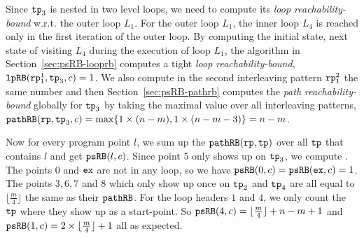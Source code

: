 Since $\mathtt{tp}_3$ is nested in two level loops, we need to compute its \emph{loop reachability-bound}
w.r.t. the outer loop $L_1$. 
For the outer loop $L_1$, the inner loop $L_4$ is reached only in the first iteration of the outer loop.
By computing the initial state, next state of visiting $L_4$
during the execution of loop $L_1$, the algorithm in Section~\ref{sec:psRB-looprb} computes a tight \emph{loop reachability-bound}, $\mathtt{lpRB}(\mathtt{rp}_1^1, \mathtt{tp}_3, c) = 1$. 
We also compute in the second interleaving pattern $\mathtt{rp}_1^2$ the same number and
then
Section~\ref{sec:psRB-pathrb} computes the  \emph{path reachability-bound} 
globally for $\mathtt{tp}_3$ by taking the maximal value over all interleaving patterns,
$\mathtt{pathRB}(\mathtt{rp}, \mathtt{tp}_3, c) = \max\{ 1 \times (n - m), 1 \times (n - m - 3) \} = n - m$.
%

Now for every program point $l$, we sum up the $\mathtt{pathRB}(\mathtt{rp}, \mathtt{tp})$ over all $\mathtt{tp}$ that contains $l$ and get $\mathtt{psRB}(l, c)$.
Since point $5$ only shows up on $\mathtt{tp}_3$, we compute .
The points $0$ and $\mathtt{ex}$ are not in any loop, so we have $\mathtt{psRB}(0, c) = \mathtt{psRB}(\mathtt{ex}, c) = 1$.
The points $3, 6, 7$ and $8$ which only show up once on $\mathtt{tp}_2$ and $\mathtt{tp}_4$ are all equal to $\lfloor\frac{m}{4}\rfloor$ the same as their $\mathtt{pathRB}$.
For the loop headers $1$ and $4$, we only count the $\mathtt{tp}$ where they show up as a start-point.
So $\mathtt{psRB}(4, c) = \lfloor\frac{m}{4}\rfloor + n - m + 1$ and $\mathtt{psRB}(1,c) = 2 \times \lfloor\frac{m}{4}\rfloor + 1$ all as expected.